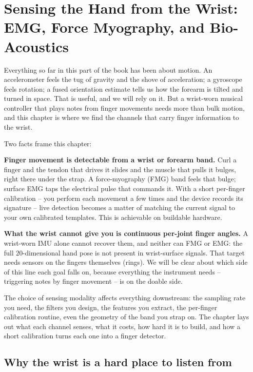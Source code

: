 \chapter{Sensing the Hand from the Wrist: EMG, Force Myography, and Bio-Acoustics}

Everything so far in this part of the book has been about motion. An accelerometer
feels the tug of gravity and the shove of acceleration; a gyroscope feels rotation;
a fused orientation estimate tells us how the forearm is tilted and turned in space.
That is useful, and we will rely on it. But a wrist-worn
musical controller that plays notes from finger movements needs more than bulk
motion, and this chapter is where we find the channels that carry finger information
to the wrist.

\begin{focusbox}
Two facts frame this chapter:

\textbf{Finger movement is detectable from a wrist or forearm band.} Curl a finger
and the tendon that drives it slides and the muscle that pulls it bulges, right there
under the strap. A force-myography (FMG) band feels that bulge; surface EMG taps the
electrical pulse that commands it. With a short per-finger calibration -- you perform
each movement a few times and the device records its signature -- live detection
becomes a matter of matching the current signal to your own calibrated templates.
This is achievable on buildable hardware.

\textbf{What the wrist cannot give you is continuous per-joint finger angles.} A
wrist-worn IMU alone cannot recover them, and neither can FMG or EMG: the full
$20$-dimensional hand pose is not present in wrist-surface signals. That target
needs sensors on the fingers themselves (rings). We will be clear about which side of
this line each goal falls on, because everything the instrument needs --
triggering notes by finger movement -- is on the doable side.
\end{focusbox}

The choice of sensing modality affects everything downstream: the sampling rate you need,
the filters you design, the features you extract, the per-finger calibration routine,
even the geometry of the band you strap on. The chapter lays out what each channel
senses, what it costs, how hard it is to build, and how a short calibration turns
each one into a finger detector.

\section{Why the wrist is a hard place to listen from}
\label{ch37:why-hard}

